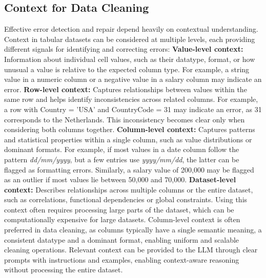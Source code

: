 \subsection{Context for Data Cleaning}
Effective error detection and repair depend heavily on contextual understanding. 
Context in tabular datasets can be considered at multiple levels, each providing different signals for identifying and correcting errors:
\newline\newline
\textbf{Value-level context:} Information about individual cell values, such as their datatype, format, or how unusual a value is relative to the expected column type. 
For example, a string value in a numeric column or a negative value in a salary column may indicate an error.
\newline
\textbf{Row-level context:} Captures relationships between values within the same row and helps identify inconsistencies across related columns.
For example, a row with Country = 'USA' and CountryCode = 31 may indicate an error, as 31 corresponds to the Netherlands. 
This inconsistency becomes clear only when considering both columns together.
\newline
\textbf{Column-level context:} Captures patterns and statistical properties within a single column, such as value distributions or dominant formats. 
For example, if most values in a date column follow the pattern \textit{dd/mm/yyyy}, but a few entries use \textit{yyyy/mm/dd}, the latter can be flagged as formatting errors. 
Similarly, a salary value of 200,000 may be flagged as an outlier if most values lie between 50,000 and 70,000. 
\newline
\textbf{Dataset-level context:} Describes relationships across multiple columns or the entire dataset, such as correlations, functional dependencies or global constraints. 
Using this context often requires processing large parts of the dataset, which can be computationally expensive for large datasets.
\newline\newline
Column-level context is often preferred in data cleaning, as columns typically have a single semantic meaning, a consistent datatype and a dominant format, enabling uniform and scalable cleaning operations. 
Relevant context can be provided to the LLM through clear prompts with instructions and examples, enabling context-aware reasoning without processing the entire dataset.


